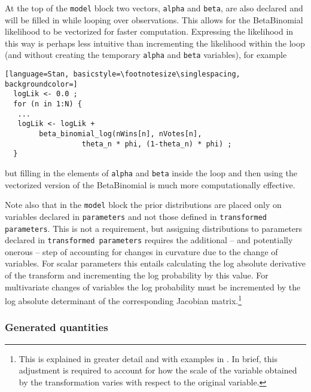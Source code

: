 At the top of the {\tt model} block two vectors, {\tt alpha} and {\tt beta}, are also declared and will be filled in while looping over observations. This allows for the BetaBinomial likelihood to be vectorized for faster computation. Expressing the likelihood in this way is perhaps less intuitive than incrementing the likelihood within the loop (and without creating the temporary {\tt alpha} and {\tt beta} variables), for example

\begin{lstlisting}[language=Stan, basicstyle=\footnotesize\singlespacing, backgroundcolor=]
  logLik <- 0.0 ;
  for (n in 1:N) {
   ...
   logLik <- logLik +
   		beta_binomial_log(nWins[n], nVotes[n], 
   				  theta_n * phi, (1-theta_n) * phi) ;
  }
\end{lstlisting}
%
\noindent but filling in the elements of {\tt alpha} and {\tt beta} inside the loop and then using the vectorized version of the BetaBinomial is much more computationally effective. 

Note also that in the {\tt model} block the prior distributions are placed only on variables declared in {\tt parameters}  and not those defined in {\tt transformed parameters}. This is not a requirement, but assigning distributions to parameters declared in {\tt transformed parameters} requires the additional -- and potentially onerous -- step of accounting for changes in curvature due to the change of variables. For scalar parameters this entails calculating the log absolute derivative of the transform and incrementing the log probability by this value. For multivariate changes of variables the log probability must be incremented by the log absolute determinant of the corresponding Jacobian matrix.\footnote{This is explained in greater detail and with examples in . In brief, this adjustment is required to account for how the scale of the variable obtained by the transformation varies with respect to the original variable.}






\subsubsection{Generated quantities}

